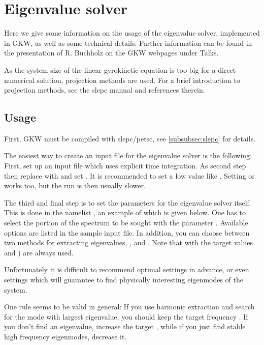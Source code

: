 \chapter{Eigenvalue solver}
\label{ch:eiv}

Here we give some information on the usage of the eigenvalue solver, implemented
in GKW, as well as some technical details. 
Further information can be found in the presentation of R. Buchholz on the GKW webpages under Talks.

As the system size of the linear gyrokinetic equation is too big for a direct numerical solution, projection
methods are used.
For a brief introduction to projection methods, see the {\sc slepc} manual \cite{SLE12} and references therein.


\section{Usage}
\label{sec:eivusage}
First, GKW must be compiled with {\sc slepc/petsc}, see \ref{subsubsec:slepc}
for details.

The easiest way to create an input file for the eigenvalue solver is the following:
First, set up an input file which uses explicit time
integration.
As second step then replace  with 
and  set . It is recommended to set a low value  like .
Setting  or  works too, but the run is then usually slower.

The third and final step is to set the parameters for the eigenvalue solver
itself. This is done in the namelist ,
an example of which is given below.
One has to select the portion of the spectrum to be sought with the parameter . Available options are listed in the sample input file.
In addition, you can choose between two methods for extracting eigenvalues,
, and .
Note that with  the target values  and ) are always used. 

Unfortunately it is difficult to recommend optimal settings in advance,
or even settings which will guarantee to find physically interesting eigenmodes of the system.

One rule seems to be valid in general:
If you use harmonic extraction and search for the mode with largest
eigenvalue, you should keep the target frequency .  
If you don't find an eigenvalue, increase the target , 
while if you just find stable high frequency eigenmodes, decrease it.

